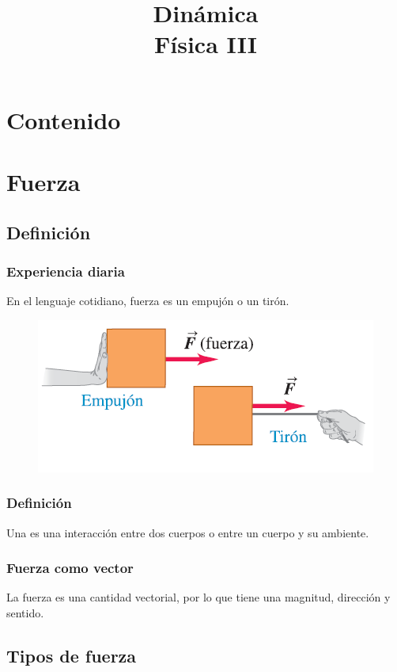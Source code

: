 \documentclass[14pt]{beamer}
\title{\Large{Dinámica} \\ \normalsize{Física III}}
\date{}
\begin{document}
\maketitle

\section*{Contenido}


\section{Fuerza}
\subsection{Definición}

\begin{frame}
\frametitle{Experiencia diaria}
En el lenguaje cotidiano, fuerza es un empujón o un tirón.
\pause
\begin{figure}
    \centering
    \includegraphics[scale=0.8]{Imagenes/Fuerza_01.png}
\end{figure}
\end{frame}
\begin{frame}
\frametitle{Definición}
Una  es una interacción entre dos cuerpos o entre un cuerpo y su ambiente.
\end{frame}
\begin{frame}
\frametitle{Fuerza como vector}
La fuerza es una cantidad vectorial, por lo que tiene una magnitud, dirección y sentido.
\end{frame}

\subsection{Tipos de fuerza}
\end{document}

